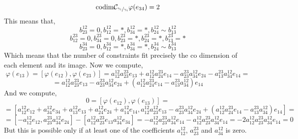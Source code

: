 \documentclass{article}
\begin{document}
\[\mathrm{codim}\mathcal{C}_{\sfrac{\gamma_1}{\gamma_4}}\varphi(e_{34})=2\]
This means that,
\[b_{23}^{12}=0,b_{12}^{12}=*,b_{34}^{12}=*,b_{24}^{12}\sim b_{13}^{12}\]
\[b_{12}^{23}=0,b_{34}^{23}=0,b_{23}^{23}=*,b_{24}^{23}=*,b_{13}^{23}=*\]
\[b_{23}^{34}=0,b_{12}^{34}=*,b_{34}^{34}=*,b_{24}^{34}\sim b_{13}^{34}\]
Which means that the number of constraints fit precisely the co dimension of each element and its image. 
Now we compute,
\[\varphi(e_{13})=[\varphi(e_{12}),\varphi(e_{23})]= a_{12}^{12}a_{23}^{23}e_{13}+a_{12}^{12}a_{24}^{23}e_{14}-a_{23}^{23}a_{34}^{12}e_{24}-a_{13}^{23}a_{34}^{12}e_{14}=\]\[=a_{12}^{12}a_{23}^{23}e_{13}-a_{23}^{23}a_{34}^{12}e_{24}+(a_{12}^{12}a_{24}^{23}e_{14}-a_{13}^{23}a_{34}^{12})e_{14}\]
And we compute,
\[
0=[\varphi(e_{12}),\varphi(e_{13})]=\]\[=[a_{12}^{12}e_{12}+a_{34}^{12}e_{34}+a_{13}^{12}e_{13}+a_{24}^{12}e_{24}+a_{14}^{12}e_{14},a_{12}^{12}a_{23}^{12}e_{13}-a_{23}^{23}a_{34}^{12}e_{24}+(a_{12}^{12}a_{24}^{23}e_{14}-a_{13}^{23}a_{34}^{12})e_{14}]=\]\[=[-a_{12}^{12}e_{12},a_{23}^{23}a_{34}^{12}e_{24}]-[a_{12}^{12}a_{23}^{23}e_{13}a_{34}^{12}e_{34}]=-a_{12}^{12}a_{23}^{23}a_{34}^{12}e_{14}-a_{12}^{12}a_{23}^{23}a_{34}^{12}e_{14}=-2a_{12}^{12}a_{23}^{23}a_{34}^{12}e_{14}=0
\]
But this is possible only if at least one of the coefficients $a_{12}^{12}$, $a_{23}^{23}$ and $a_{34}^{12}$ is zero. 
\end{document}
